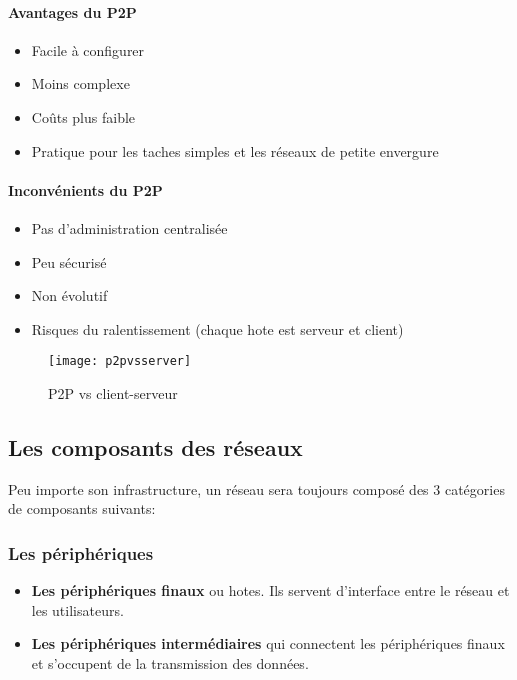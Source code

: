 \documentclass[10pt,a4paper]{article}
\begin{document}
 \paragraph{Avantages du P2P}

 \smallskip

 \begin{itemize}
	 \item Facile à configurer
	 \item Moins complexe
	 \item Coûts plus faible
	 \item Pratique pour les taches simples et les réseaux de petite envergure
 \end{itemize}

 \paragraph{Inconvénients du P2P}

 \smallskip

 \begin{itemize}
	 \item Pas d'administration centralisée
	 \item Peu sécurisé
	 \item Non évolutif
	 \item Risques du ralentissement (chaque hote est serveur et client)
 \end{itemize}

 \begin{figure}[h]
	 \centering
	 \texttt{[image: p2pvsserver]}
	 \caption{P2P vs client-serveur}
 \end{figure}

 \subsection{Les composants des réseaux}
 Peu importe son infrastructure, un réseau sera toujours composé des 3 catégories de composants suivants:
 \subsubsection{Les périphériques}
 \begin{itemize}
	 \item \textbf{Les périphériques finaux} ou hotes. Ils servent d'interface entre le réseau et les utilisateurs.
	 \item \textbf{Les périphériques intermédiaires} qui connectent les périphériques finaux et s'occupent de la transmission des données.
 \end{itemize}
\end{document}
